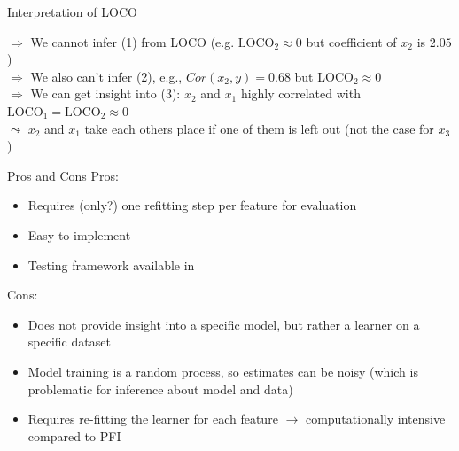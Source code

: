 \documentclass[11pt,compress,t,notes=noshow, aspectratio=169, xcolor=table]{beamer}
\begin{document}
\begin{frame}{Interpretation of LOCO}
\lz\pause

$\Rightarrow$ We cannot infer (1) from LOCO (e.g. $\text{LOCO}_2 \approx 0$ but coefficient of $x_2$ is $2.05$)\\\pause
$\Rightarrow$ We also can't infer (2), e.g., $Cor(x_2, y) = 0.68$ but $\text{LOCO}_2 \approx 0$\\\pause
$\Rightarrow$ We can get insight into (3): $x_2$ and $x_1$ highly correlated with $\text{LOCO}_1 = \text{LOCO}_2  \approx 0$ \\
\phantom{$\Rightarrow$} $\leadsto$ $x_2$ and $x_1$ take each others place if one of them is left out (not the case for $x_3$)
\end{frame}

\begin{frame}{Pros and Cons}
  Pros:
  \begin{itemize}
    \item Requires (only?) one refitting step per feature for evaluation
    \item Easy to implement
    \item Testing framework available in 
  \end{itemize}
%
  Cons:
  \begin{itemize}
    \item Does not provide insight into a specific model, but rather a learner on a specific dataset
    \item Model training is a random process, so estimates can be noisy (which is problematic for inference about model and data)
    \item Requires re-fitting the learner for each feature $\rightarrow$ computationally intensive compared to PFI
  \end{itemize}
\end{frame}


\endlecture
\end{document}
